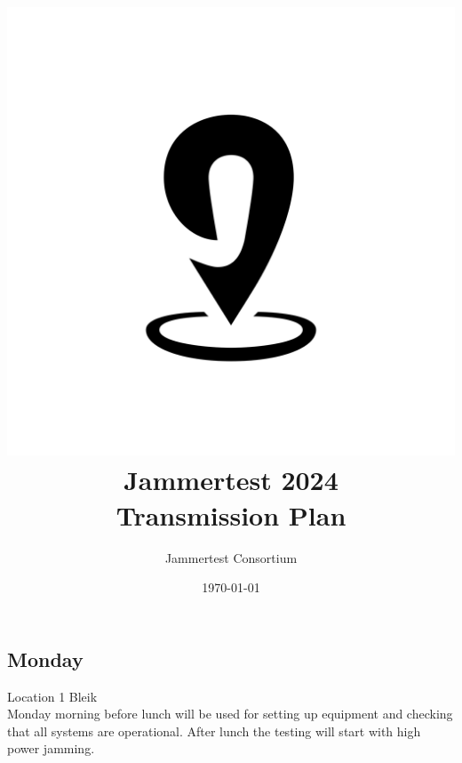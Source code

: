 \documentclass[a4paper]{book}
\title{\includegraphics[scale=0.2]{graphics/jampin.png}\\ Jammertest 2024 \\ \huge{Transmission Plan}}
\author{Jammertest Consortium}
\date{\today \\ \DTMcurrenttime}
\begin{document}
\maketitle

\tableofcontents
\restoregeometry



\begin{landscape}
\chapter{Monday}
\Large Location 1 Bleik \\
Monday morning before lunch will be used for setting up equipment and checking that all systems are operational. After lunch the testing will start with high power jamming.

\end{landscape}
\end{document}
